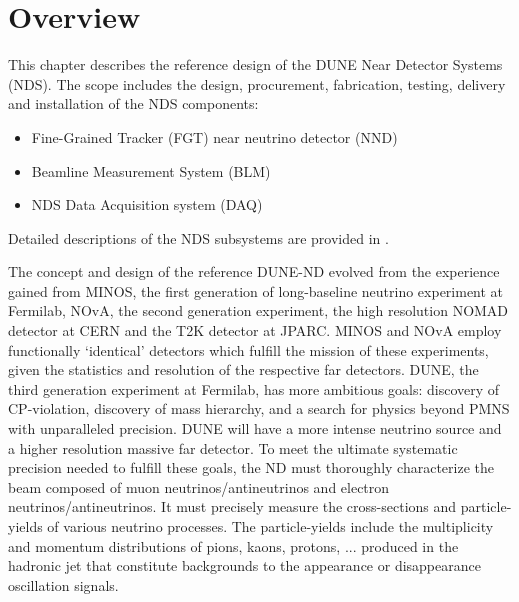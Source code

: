\section{Overview} %
\label{sec:detectors-nd-ref-ov}

This chapter describes the reference design of the DUNE Near Detector
Systems (NDS). The scope includes the design, procurement,
fabrication, testing, delivery and installation of the NDS components:
\begin{itemize}
\item Fine-Grained Tracker (FGT) near neutrino detector (NND)
\item Beamline Measurement System (BLM)
\item NDS Data Acquisition system (DAQ)  
\end{itemize}
Detailed descriptions of the NDS subsystems are provided in \anxndref. 


The concept and design of the reference DUNE-ND evolved from the
experience gained from MINOS, the first generation of long-baseline
neutrino experiment at Fermilab, NOvA, the second generation
experiment, the high resolution NOMAD detector at CERN and the T2K
detector at JPARC. MINOS and NOvA employ functionally `identical'
detectors which fulfill the mission of these experiments, given the
statistics and resolution of the respective far detectors.  DUNE, the
third generation experiment at Fermilab, has more ambitious goals:
discovery of CP-violation, discovery of mass hierarchy, and a search
for physics beyond PMNS with unparalleled precision. DUNE will have a
more intense neutrino source and a higher resolution massive far detector.  To
meet the ultimate systematic precision needed to fulfill these goals,
the ND must thoroughly characterize the beam composed of muon
neutrinos/antineutrinos and electron neutrinos/antineutrinos. It must
precisely measure the cross-sections and particle-yields of various
neutrino processes.  The particle-yields include the multiplicity and
momentum distributions of pions, kaons, protons, ... produced in the
hadronic jet that constitute backgrounds to the appearance or disappearance oscillation signals.

